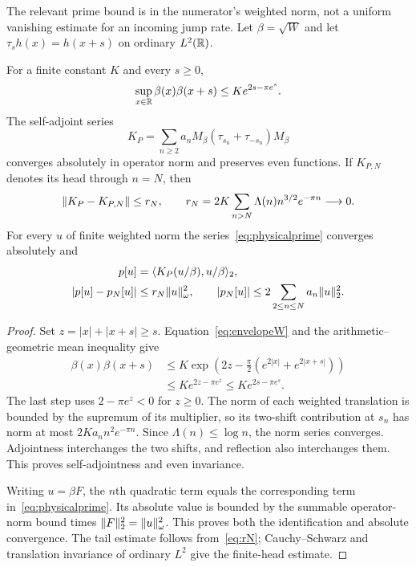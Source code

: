 The relevant prime bound is in the numerator's weighted norm, not a uniform vanishing estimate for an incoming jump rate. Let $\beta=\sqrt W$ and let $\tau_sh(x)=h(x+s)$ on ordinary $L^2(\mathbb R)$.

\begin{lemma}\label{lem:prime}
For a finite constant $K$ and every $s\ge0$,
\begin{equation}\label{eq:betaprod}
 \sup_{x\in\mathbb R}\beta(x)\beta(x+s)\le K e^{2s-\pi e^s}.
\end{equation}
The self-adjoint series
\begin{equation}\label{eq:KP}
 K_P=\sum_{n\ge2}a_nM_\beta(\tau_{s_n}+\tau_{-s_n})M_\beta
\end{equation}
converges absolutely in operator norm and preserves even functions. If $K_{P,N}$ denotes its head through $n=N$, then
\begin{equation}\label{eq:rN}
 \lVert K_P-K_{P,N}\rVert\le r_N,
 \qquad r_N=2K\sum_{n>N}\Lambda(n)n^{3/2}e^{-\pi n}\longrightarrow0.
\end{equation}
For every $u$ of finite weighted norm the series~\eqref{eq:physicalprime} converges absolutely and
\begin{align}
 p[u]&=\langle K_P(u/\beta),u/\beta\rangle_2,\label{eq:prepresentation}\\
 |p[u]-p_N[u]|&\le r_N\lVert u\rVert_\omega^2,\qquad
 |p_N[u]|\le2\sum_{2\le n\le N}a_n\lVert u\rVert_2^2.\label{eq:headtail}
\end{align}
\end{lemma}
\begin{proof}
Set $z=|x|+|x+s|\ge s$. Equation~\eqref{eq:envelopeW} and the arithmetic--geometric mean inequality give
\begin{align*}
 \beta(x)\beta(x+s)
 &\le K\exp\!\left(2z-\frac\pi2(e^{2|x|}+e^{2|x+s|})\right)\\
 &\le K e^{2z-\pi e^z}\le K e^{2s-\pi e^s}.
\end{align*}
The last step uses $2-\pi e^z<0$ for $z\ge0$. The norm of each weighted translation is bounded by the supremum of its multiplier, so its two-shift contribution at $s_n$ has norm at most $2Ka_nn^2e^{-\pi n}$. Since $\Lambda(n)\le\log n$, the norm series converges. Adjointness interchanges the two shifts, and reflection also interchanges them. This proves self-adjointness and even invariance.

Writing $u=\beta F$, the $n$th quadratic term equals the corresponding term in~\eqref{eq:physicalprime}. Its absolute value is bounded by the summable operator-norm bound times $\lVert F\rVert_2^2=\lVert u\rVert_\omega^2$. This proves both the identification and absolute convergence. The tail estimate follows from~\eqref{eq:rN}; Cauchy--Schwarz and translation invariance of ordinary $L^2$ give the finite-head estimate.
\end{proof}


